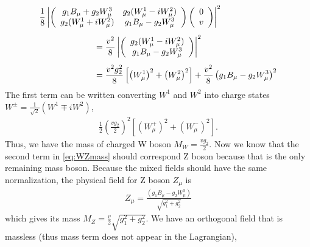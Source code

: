 \begin{eqnarray}
\label{eq:WZmass}
\begin{array}{ccc} \multicolumn{2}{c}{ \displaystyle \vspace{0.3cm}   
\frac{1}{8} \left| \left(  \begin{array}{cc} 
g_1 B_\mu + g_2 W_\mu^3     & g_2 (W_\mu^1 - iW_\mu^2) \\
g_2 (W_\mu^1 + iW_\mu^2)    & g_1 B_\mu - g_2 W_\mu^3 \end{array} \right) 
\left(  \begin{array}{c} 0 \\ v \end{array} \right) \right|^2 
} & \\ & \multicolumn{2}{l}{\hspace{2cm} \vspace{0.3cm} \displaystyle   
= \frac{v^2}{8} \left| \left(  \begin{array}{c} 
g_2 (W_\mu^1 - iW_\mu^2) \\
g_1 B_\mu - g_2 W_\mu^3 
\end{array} \right) \right|^2} \\  
& \multicolumn{2}{l}{\hspace{2cm}  \displaystyle   
=   
\frac{v^2 g_2^2}{8} \left[ \left( W_\mu^1 \right)^2  + \left( W_\mu^2 \right)^2 \right] 
+ \frac{v^2}{8} \left( g_1 B_\mu - g_2 W_\mu^3 \right)^2
} \end{array}    
\end{eqnarray} 
The first term can be written converting $W^1$ and $W^2$ into 
charge states $\displaystyle W^\pm = \frac{1}{\sqrt{2}} \left( W^1 \mp iW^2 \right)$, 
\begin{eqnarray}
\frac{1}{2} \left( \frac{v g_2}{2} \right)^2 
\left[ \left( W_\mu^+ \right)^2  + \left( W_\mu^- \right)^2 \right]. 
\end{eqnarray} 
Thus, we have the mass of charged W boson $\displaystyle M_W = \frac{v g_2}{2}$.
Now we know that the second term in \ref{eq:WZmass} should correspond 
Z boson because that is the only remaining mass boson. Because the 
mixed fields should have the same normalization, the physical field for 
Z boson $Z_\mu$ is 
\begin{eqnarray} 
Z_\mu = \frac{\left( g_1 B_\mu - g_2 W_\mu^3 \right)}{\sqrt{g_1^2+g_2^2}}  
\end{eqnarray} 
which gives its mass $\displaystyle M_Z = \frac{v}{2} \sqrt{g_1^2+g_2^2}$. 
We have an orthogonal field that is massless 
(thus mass term does not appear in the Lagrangian), 
